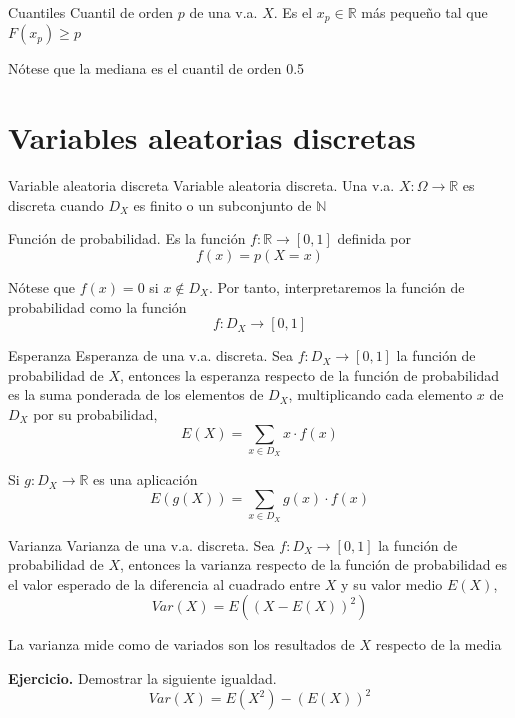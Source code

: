 \documentclass[
  ignorenonframetext,
]{beamer}
\begin{document}
\begin{frame}{Cuantiles}
\protect\hypertarget{cuantiles}{}
Cuantil de orden \(p\) de una v.a. \(X\). Es el \(x_p\in\mathbb{R}\) más
pequeño tal que \(F(x_p)\ge p\)

Nótese que la mediana es el cuantil de orden 0.5
\end{frame}

\hypertarget{variables-aleatorias-discretas}{%
\section{Variables aleatorias
discretas}\label{variables-aleatorias-discretas}}

\begin{frame}{Variable aleatoria discreta}
\protect\hypertarget{variable-aleatoria-discreta}{}
Variable aleatoria discreta. Una v.a.
\(X:\Omega\longrightarrow \mathbb{R}\) es discreta cuando \(D_X\) es
finito o un subconjunto de \(\mathbb{N}\)

Función de probabilidad. Es la función
\(f:\mathbb{R}\longrightarrow[0,1]\) definida por \[f(x) = p(X=x)\]

Nótese que \(f(x)=0\) si \(x\not\in D_X\). Por tanto, interpretaremos la
función de probabilidad como la función \[f:D_X\longrightarrow [0,1]\]
\end{frame}

\begin{frame}{Esperanza}
\protect\hypertarget{esperanza}{}
Esperanza de una v.a. discreta. Sea \(f:D_X\longrightarrow[0,1]\) la
función de probabilidad de \(X\), entonces la esperanza respecto de la
función de probabilidad es la suma ponderada de los elementos de
\(D_X\), multiplicando cada elemento \(x\) de \(D_X\) por su
probabilidad, \[E(X) = \sum_{x\in D_X}x\cdot f(x)\]

Si \(g:D_X\longrightarrow \mathbb{R}\) es una aplicación
\[E(g(X))=\sum_{x\in D_X}g(x)\cdot f(x)\]
\end{frame}

\begin{frame}{Varianza}
\protect\hypertarget{varianza}{}
Varianza de una v.a. discreta. Sea \(f:D_X\longrightarrow[0,1]\) la
función de probabilidad de \(X\), entonces la varianza respecto de la
función de probabilidad es el valor esperado de la diferencia al
cuadrado entre \(X\) y su valor medio \(E(X)\),
\[Var(X)= E((X-E(X))^2) \]

La varianza mide como de variados son los resultados de \(X\) respecto
de la media

\textbf{Ejercicio.} Demostrar la siguiente igualdad.
\[Var(X)= E(X^2)-(E(X))^2\]
\end{frame}
\end{document}
